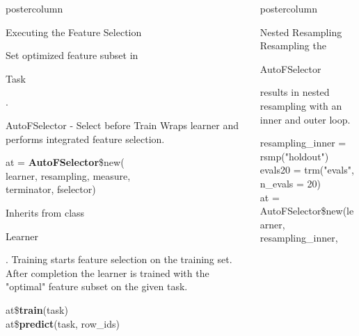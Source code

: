 \documentclass{beamer}
\newlength{\columnheight} %
\newcommand{\codeinline}[1]{\begin{codeboxinline}#1\end{codeboxinline}}
\begin{document}
\begin{frame}[fragile]{}
\begin{columns}
\begin{column}{.245\textwidth}
\begin{beamercolorbox}[center]{postercolumn}
\begin{minipage}{.98\textwidth}
{\begin{myblock}{Executing the Feature Selection}
\begin{codebox}
							\end{codebox}
							Set optimized feature subset in \codeinline{Task}.
						\end{myblock}
						\begin{myblock}{AutoFSelector - Select before Train}
						Wraps learner and performs integrated feature selection.
						\\
						\begin{codeboxmultiline}[width=24.5cm]
							at = \textbf{AutoFSelector}\$new(\\
							\hspace*{1ex}learner, resampling, measure, \\
							\hspace*{1ex}terminator, fselector)
						\end{codeboxmultiline}
						\vspace{0.5em}
						Inherits from class \codeinline{Learner}.
						Training starts feature selection on the training set.
						After completion the learner is trained with the "optimal" feature subset on the given task.
						\\
						\begin{codeboxmultiline}[width=16.5cm]
							at\$\textbf{train}(task)\\
							at\$\textbf{predict}(task, row\_ids)
						\end{codeboxmultiline}
					\end{myblock}
						\vfill}
				\end{minipage}
			\end{beamercolorbox}
		\end{column}
		\begin{column}{.245\textwidth}
			\begin{beamercolorbox}[center]{postercolumn}
				\begin{minipage}{.98\textwidth}
					\parbox[t][\columnheight]{\textwidth}{
						\begin{myblock}{Nested Resampling}
							Resampling the \codeinline{AutoFSelector} results in nested resampling with an inner and outer loop.
							\\
							\begin{codeboxexample}
								{\tiny
									resampling\_inner = rsmp("holdout")\\
									evals20 = trm("evals", n\_evals = 20)
									\vspace{1em}
									\\
									at = AutoFSelector\$new(learner, resampling\_inner, \\
}
\end{codeboxexample}
\end{myblock}}
\end{minipage}
\end{beamercolorbox}
\end{column}
\end{columns}
\end{frame}
\end{document}
